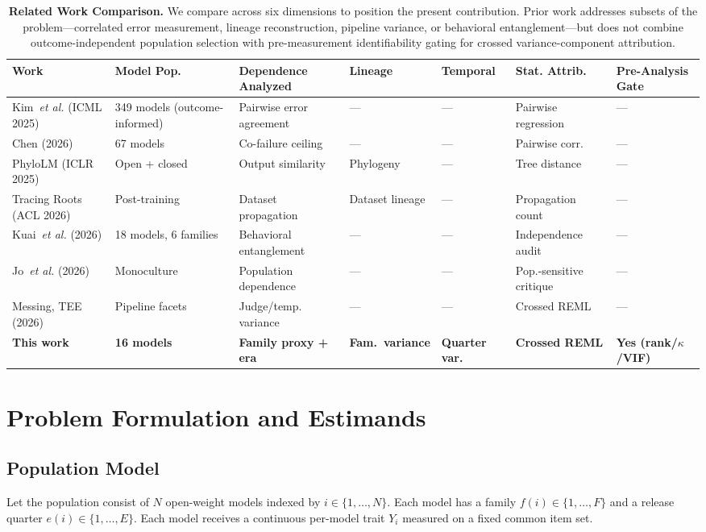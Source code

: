 \documentclass{ieeeaccess}
\theoremstyle{definition}
\theoremstyle{plain}
\begin{document}
\begin{table}[!t]
\caption{\textbf{Related Work Comparison.} We compare across six dimensions to position the present contribution. Prior work addresses subsets of the problem---correlated error measurement, lineage reconstruction, pipeline variance, or behavioral entanglement---but does not combine outcome-independent population selection with pre-measurement identifiability gating for crossed variance-component attribution.}
\label{tab:diff}
\centering
\footnotesize
\begin{tabular}{p{68pt}p{72pt}p{82pt}p{50pt}p{40pt}p{62pt}p{82pt}}
\hline
\textbf{Work} & \textbf{Model Pop.} & \textbf{Dependence Analyzed} & \textbf{Lineage} & \textbf{Temporal} & \textbf{Stat. Attrib.} & \textbf{Pre-Analysis Gate} \\
\hline
Kim~\textit{et al.} (ICML 2025) & 349 models (outcome-informed) & Pairwise error agreement & --- & --- & Pairwise regression & --- \\
\hline
Chen (2026) & 67 models & Co-failure ceiling & --- & --- & Pairwise corr. & --- \\
\hline
PhyloLM (ICLR 2025) & Open + closed & Output similarity & Phylogeny & --- & Tree distance & --- \\
\hline
Tracing Roots (ACL 2026) & Post-training & Dataset propagation & Dataset lineage & --- & Propagation count & --- \\
\hline
Kuai~\textit{et al.} (2026) & 18 models, 6 families & Behavioral entanglement & --- & --- & Independence audit & --- \\
\hline
Jo~\textit{et al.} (2026) & Monoculture & Population dependence & --- & --- & Pop.-sensitive critique & --- \\
\hline
Messing, TEE (2026) & Pipeline facets & Judge/temp. variance & --- & --- & Crossed REML & --- \\
\hline
\textbf{This work} & \textbf{16 models} & \textbf{Family proxy + era} & \textbf{Fam.\ variance} & \textbf{Quarter var.} & \textbf{Crossed REML} & \textbf{Yes (rank/$\kappa$/VIF)} \\
\hline
\end{tabular}
\end{table}

\section{Problem Formulation and Estimands}
\label{sec:model}

\subsection{Population Model}
Let the population consist of $N$ open-weight models indexed by $i \in \{1, \ldots, N\}$. Each model has a family $f(i) \in \{1, \ldots, F\}$ and a release quarter $e(i) \in \{1, \ldots, E\}$. Each model receives a continuous per-model trait $Y_i$ measured on a fixed common item set.
\end{document}
